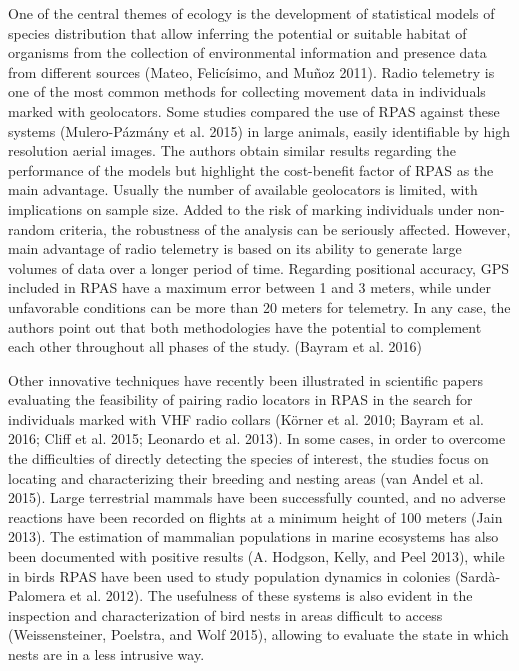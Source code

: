 \documentclass[]{interact}
\theoremstyle{plain}%
\theoremstyle{definition}
\theoremstyle{remark}
\begin{document}
One of the central themes of ecology is the development of statistical
models of species distribution that allow inferring the potential or
suitable habitat of organisms from the collection of environmental
information and presence data from different sources (Mateo, Felicísimo,
and Muñoz 2011). Radio telemetry is one of the most common methods for
collecting movement data in individuals marked with geolocators. Some
studies compared the use of RPAS against these systems (Mulero-Pázmány
et al. 2015) in large animals, easily identifiable by high resolution
aerial images. The authors obtain similar results regarding the
performance of the models but highlight the cost-benefit factor of RPAS
as the main advantage. Usually the number of available geolocators is
limited, with implications on sample size. Added to the risk of marking
individuals under non-random criteria, the robustness of the analysis
can be seriously affected. However, main advantage of radio telemetry is
based on its ability to generate large volumes of data over a longer
period of time. Regarding positional accuracy, GPS included in RPAS have
a maximum error between 1 and 3 meters, while under unfavorable
conditions can be more than 20 meters for telemetry. In any case, the
authors point out that both methodologies have the potential to
complement each other throughout all phases of the study. (Bayram et al.
2016)

Other innovative techniques have recently been illustrated in scientific
papers evaluating the feasibility of pairing radio locators in RPAS in
the search for individuals marked with VHF radio collars (Körner et al.
2010; Bayram et al. 2016; Cliff et al. 2015; Leonardo et al. 2013). In
some cases, in order to overcome the difficulties of directly detecting
the species of interest, the studies focus on locating and
characterizing their breeding and nesting areas (van Andel et al. 2015).
Large terrestrial mammals have been successfully counted, and no adverse
reactions have been recorded on flights at a minimum height of 100
meters (Jain 2013). The estimation of mammalian populations in marine
ecosystems has also been documented with positive results (A. Hodgson,
Kelly, and Peel 2013), while in birds RPAS have been used to study
population dynamics in colonies (Sardà-Palomera et al. 2012). The
usefulness of these systems is also evident in the inspection and
characterization of bird nests in areas difficult to access
(Weissensteiner, Poelstra, and Wolf 2015), allowing to evaluate the
state in which nests are in a less intrusive way.
\end{document}
